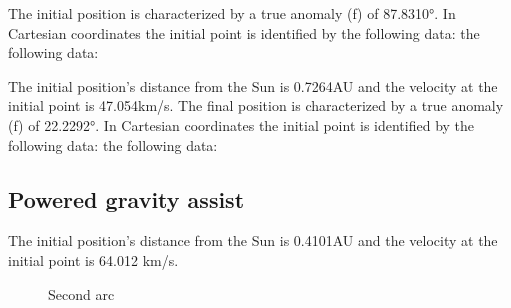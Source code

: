 \documentclass[11pt,a4paper]{report}
\begin{document}
The initial position is characterized by a true anomaly (f) of 87.8310°. In Cartesian coordinates the initial point is identified by the following data:
the following data:

\begin{table}[H]
\centering
{}
\end{table}

The initial position’s distance from the Sun is 0.7264AU and the velocity at the initial point is 47.054km/s.
The final position is characterized by a true anomaly (f) of 22.2292°. In Cartesian coordinates the initial point is identified by the following data:
the following data:

\begin{table}[H]
\centering
{}
\end{table}

\subsection{Powered gravity assist}

The initial position’s distance from the Sun is 0.4101AU and the velocity at the initial point is 64.012 km/s.

\begin{figure}[H]
\centering
{}
    \caption{Second arc}
\end{figure}
\end{document}

